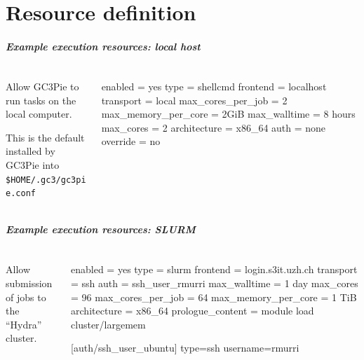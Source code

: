 \documentclass[english,serif,mathserif,usenames,dvipsnames]{beamer}
\begin{document}
\part{Resource definition}
\begin{frame}[fragile,label=resources]
  \frametitle{Example execution resources: local host}
  \begin{columns}[t]
    \begin{column}{0.5\textwidth}
      Allow GC3Pie to run tasks on the local computer.

      \+ This is the default installed by GC3Pie
      into \lstinline|$HOME/.gc3/gc3pie.conf| %
    \end{column}
    \begin{column}{0.5\textwidth}
  \begin{stdout}
enabled = yes
type = shellcmd
frontend = localhost
transport = local
max_cores_per_job = 2
max_memory_per_core = 2GiB
max_walltime = 8 hours
max_cores = 2
architecture = x86_64
auth = none
override = no
\end{stdout}
    \end{column}
  \end{columns}
\end{frame}


\begin{frame}[fragile]
  \frametitle{Example execution resources: SLURM}
  \begin{columns}[t]
    \begin{column}{0.5\textwidth}
      Allow submission of jobs to the ``Hydra'' cluster.
    \end{column}
    \begin{column}{0.5\textwidth}
\begin{stdout}
enabled = yes
type = slurm
frontend = login.s3it.uzh.ch
transport = ssh
auth = ssh_user_rmurri
max_walltime = 1 day
max_cores = 96
max_cores_per_job = 64
max_memory_per_core = 1 TiB
architecture = x86_64
prologue_content =
  module load cluster/largemem

[auth/ssh_user_ubuntu]
type=ssh
username=rmurri
\end{stdout}
    \end{column}
  \end{columns}
\end{frame}
\end{document}
